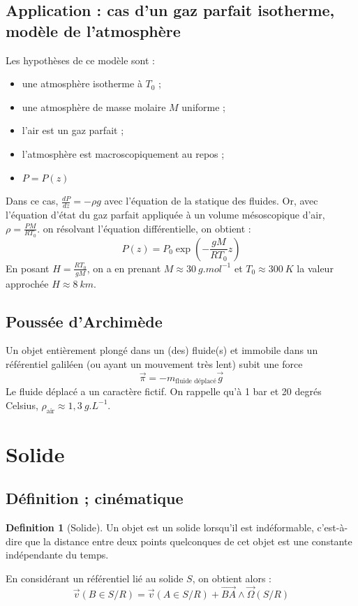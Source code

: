 \documentclass[french]{book}
\theoremstyle{plain}
\theoremstyle{definition}
\newtheorem{dfn}{Definition}
\theoremstyle{remark}
\newcommand{\inv}{^{-1}}
\begin{document}
\subsection{Application : cas d'un gaz parfait isotherme, modèle de l'atmosphère}
Les hypothèses de ce modèle sont : 
\begin{itemize}
	\item une atmosphère isotherme à $T_0$ ;
	\item une atmosphère de masse molaire $M$ uniforme ;
	\item l'air est un gaz parfait ;
	\item l'atmosphère est macroscopiquement au repos ;
	\item $P=P(z)$
\end{itemize}
Dans ce cas, $\displaystyle\frac{dP}{dz}=-\rho g$ avec l'équation de la statique des fluides. Or, avec l'équation d'état du gaz parfait appliquée à un volume mésoscopique d'air, $\rho=\displaystyle\frac{PM}{RT_0}$. on résolvant l'équation différentielle, on obtient : $$P(z)=P_0\exp\left(-\frac{gM}{RT_0}z\right)$$ En posant $H=\displaystyle\frac{RT_0}{gM}$, on a en prenant $M\approx 30 \ g.mol\inv$ et $T_0\approx 300\ K$ la valeur approchée $H\approx 8\ km$.
\subsection{Poussée d'Archimède}
Un objet entièrement plongé dans un (des) fluide(s) et immobile dans un référentiel galiléen (ou ayant un mouvement très lent) subit une force $$\overrightarrow{\pi}=-m_{\text{fluide déplacé}}\overrightarrow{g}$$ Le fluide déplacé a un caractère fictif. On rappelle qu'à 1 bar et 20 degrés Celsius, $\rho_{\text{air}}\approx 1,3\ g.L\inv$.
\section{Solide}
\subsection{Définition ; cinématique}
\begin{dfn}[Solide]
	Un objet est un solide lorsqu'il est indéformable, c'est-à-dire que la distance entre deux points quelconques de cet objet est une constante indépendante du temps.
\end{dfn}
En considérant un référentiel lié au solide $S$, on obtient alors : $$\overrightarrow{v}(B\in S/R)=\overrightarrow{v}(A\in S/R)+\overrightarrow{BA}\wedge\overrightarrow{\Omega}(S/R)$$
\end{document}
